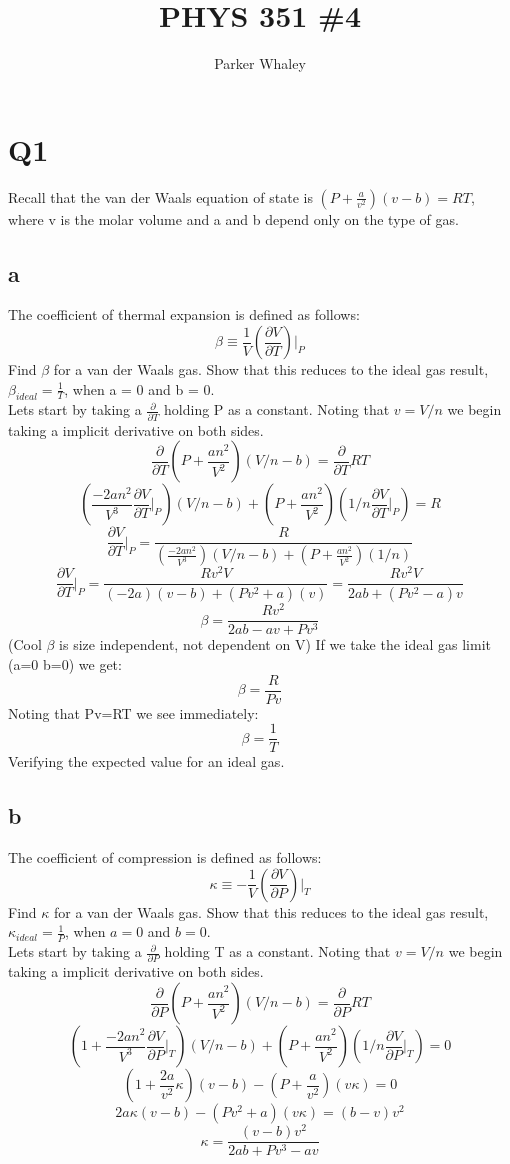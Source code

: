 \documentclass[10pt,a4paper]{article}
\author{Parker Whaley}
\title{PHYS 351 \#4}
\begin{document}
\maketitle

\section{Q1}
Recall that the van der Waals equation of state is $(P +\frac{a}{v^2} )(v - b) = RT$, where v is
the molar volume and a and b depend only on the type of gas.
\subsection{a}
The coefficient of thermal expansion is defined as follows:
\[\beta \equiv \frac{1}{V}(\frac{\partial V}{\partial T})\biggr |_P\]
Find $\beta$ for a van der Waals gas. Show that this reduces to the ideal gas result, $\beta_{ideal} =\frac{1}{T}$, when a = 0 and b = 0.\\

Lets start by taking a $\frac{\partial}{\partial T}$ holding P as a constant.  Noting that $v=V/n$ we begin taking a implicit derivative on both sides.
\[\frac{\partial}{\partial T}(P +\frac{an^2}{V^2} )(V/n - b) = \frac{\partial}{\partial T}RT\]
\[(\frac{-2an^2}{V^3}\frac{\partial V}{\partial T}\biggr |_P )(V/n - b)+(P +\frac{an^2}{V^2} )(1/n\frac{\partial V}{\partial T}\biggr |_P) = R\]
\[\frac{\partial V}{\partial T}\biggr |_P =\frac{R}{(\frac{-2an^2}{V^3})(V/n - b)+(P +\frac{an^2}{V^2} )(1/n)}\]
\[\frac{\partial V}{\partial T}\biggr |_P =\frac{Rv^2V}{(-2a)(v - b)+(Pv^2 +a )(v)}=  \frac{Rv^2V}{2ab+(Pv^2-a)v}\]
\[\beta=\frac{Rv^2}{2ab-av+Pv^3}\]
(Cool $\beta$ is size independent, not dependent on V)  If we take the ideal gas limit (a=0 b=0) we get:
\[\beta=\frac{R}{Pv}\]
Noting that Pv=RT we see immediately:
\[\beta=\frac{1}{T}\]
Verifying the expected value for an ideal gas.
\subsection{b}
The coefficient of compression is defined as follows:
\[\kappa \equiv -\frac{1}{V}(\frac{\partial V}{\partial P})\biggr |_T\]
Find $\kappa$ for a van der Waals gas. Show that this reduces to the ideal gas result, $\kappa_{ideal} =\frac{1}{P}$, when $a = 0$ and $b = 0$.\\

Lets start by taking a $\frac{\partial}{\partial P}$ holding T as a constant.  Noting that $v=V/n$ we begin taking a implicit derivative on both sides.
\[\frac{\partial}{\partial P}(P +\frac{an^2}{V^2} )(V/n - b) = \frac{\partial}{\partial P}RT\]
\[(1 +\frac{-2an^2}{V^3}\frac{\partial V}{\partial P}\biggr |_T )(V/n - b) + (P +\frac{an^2}{V^2} )(1/n\frac{\partial V}{\partial P}\biggr |_T) = 0\]
\[(1 +\frac{2a}{v^2}\kappa )(v - b) - (P +\frac{a}{v^2} )(v\kappa) = 0\]
\[2a\kappa (v - b) - (Pv^2 +a )(v\kappa) = (b - v)v^2\]
\[\kappa = \frac{(v - b)v^2}{ 2ab + Pv^3 -av }\]
\end{document}
